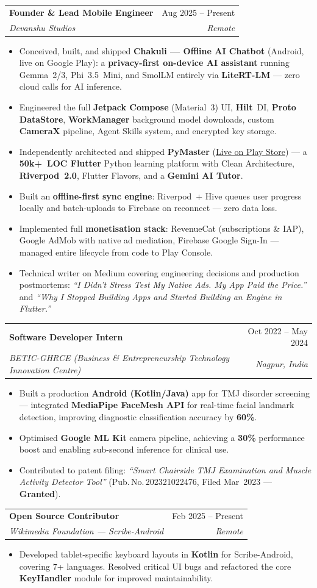 \documentclass[letterpaper,11pt]{article}
\makeatletter
\newcommand{\pnum}[1]{Pub.\,No.\,#1}
\newcommand{\resumeItem}[1]{\item\small{#1}}
\newcommand{\resumeSubheading}[4]{
  \vspace{-1pt}\item
    \begin{tabular*}{0.97\textwidth}[t]{l@{\extracolsep{\fill}}r}
      \textbf{#1} & \small #2 \\
      \textit{\small #3} & \textit{\small #4} \\
    \end{tabular*}\vspace{-5pt}
}
\newcommand{\resumeItemListStart}{
  \begin{itemize}[leftmargin=0.20in, itemsep=1pt, parsep=0pt, topsep=2pt]
}
\newcommand{\resumeItemListEnd}{\end{itemize}\vspace{2pt}}
\makeatother
\begin{document}
  \resumeSubheading
    {Founder \& Lead Mobile Engineer}{Aug 2025 -- Present}
    {Devanshu Studios}{Remote}
    \resumeItemListStart
      \resumeItem{Conceived, built, and shipped \textbf{Chakuli — Offline AI Chatbot} (Android, live on Google Play): a \textbf{privacy-first on-device AI assistant} running Gemma~2/3, Phi~3.5~Mini, and SmolLM entirely via \textbf{LiteRT-LM} — zero cloud calls for AI inference.}
      \resumeItem{Engineered the full \textbf{Jetpack Compose} (Material~3) UI, \textbf{Hilt}~DI, \textbf{Proto DataStore}, \textbf{WorkManager} background model downloads, custom \textbf{CameraX} pipeline, Agent Skills system, and encrypted key storage.}
      \resumeItem{Independently architected and shipped \textbf{PyMaster} (\href{https://play.google.com/store/apps/details?id=com.devanshustudios.pymaster}{\underline{Live on Play Store}}) — a \textbf{50k+~LOC Flutter} Python learning platform with Clean Architecture, \textbf{Riverpod~2.0}, Flutter Flavors, and a \textbf{Gemini AI Tutor}.}
      \resumeItem{Built an \textbf{offline-first sync engine}: Riverpod~+ Hive queues user progress locally and batch-uploads to Firebase on reconnect — zero data loss.}
      \resumeItem{Implemented full \textbf{monetisation stack}: RevenueCat (subscriptions \& IAP), Google AdMob with native ad mediation, Firebase Google Sign-In — managed entire lifecycle from code to Play Console.}
      \resumeItem{Technical writer on Medium covering engineering decisions and production postmortems: \textit{``I Didn't Stress Test My Native Ads. My App Paid the Price.''} and \textit{``Why I Stopped Building Apps and Started Building an Engine in Flutter.''}}
    \resumeItemListEnd

  \resumeSubheading
    {Software Developer Intern}{Oct 2022 -- May 2024}
    {BETIC-GHRCE (Business \& Entrepreneurship Technology Innovation Centre)}{Nagpur, India}
    \resumeItemListStart
      \resumeItem{Built a production \textbf{Android (Kotlin/Java)} app for TMJ disorder screening — integrated \textbf{MediaPipe FaceMesh API} for real-time facial landmark detection, improving diagnostic classification accuracy by \textbf{60\%}.}
      \resumeItem{Optimised \textbf{Google ML Kit} camera pipeline, achieving a \textbf{30\%} performance boost and enabling sub-second inference for clinical use.}
      \resumeItem{Contributed to patent filing: \textit{``Smart Chairside TMJ Examination and Muscle Activity Detector Tool''} (\pnum{202321022476}, Filed Mar~2023 — \textbf{Granted}).}
    \resumeItemListEnd

  \resumeSubheading
    {Open Source Contributor}{Feb 2025 -- Present}
    {Wikimedia Foundation — Scribe-Android}{Remote}
    \resumeItemListStart
      \resumeItem{Developed tablet-specific keyboard layouts in \textbf{Kotlin} for Scribe-Android, covering 7+ languages. Resolved critical UI bugs and refactored the core \textbf{KeyHandler} module for improved maintainability.}
    \resumeItemListEnd
\end{document}
